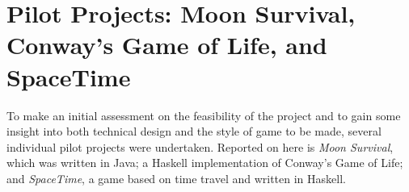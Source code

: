 \section{Pilot Projects: Moon Survival, Conway's Game of Life, and SpaceTime}


To make an initial assessment on the feasibility of the project and to gain some insight into both technical design and the style of game to be made, several individual pilot projects were undertaken. Reported on here is \emph{Moon Survival}, which was written in Java; a Haskell implementation of Conway's Game of Life;\cite{gardner1970mathematical} and \emph{SpaceTime}, a game based on time travel and written in Haskell.




